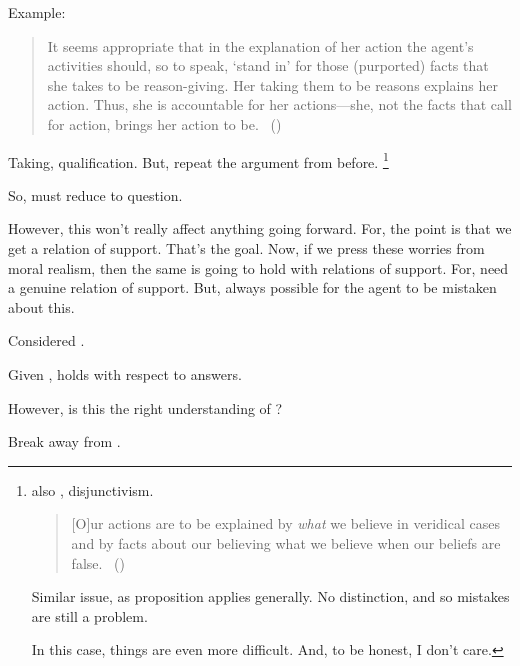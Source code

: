 \begin{note}
  Example:

  \citeauthor{Hieronymi:2011aa}
  \begin{quote}
    It seems appropriate that in the explanation of her action the agent’s activities should, so to speak, ‘stand in’ for those (purported) facts that she takes to be reason-giving.
    Her taking them to be reasons explains her action.
    Thus, she is accountable for her actions---she, not the facts that call for action, brings her action to be.%
    \mbox{ }\hfill\mbox{(\citeyear[425]{Hieronymi:2011aa})}
  \end{quote}

  Taking, qualification.
  But, repeat the argument from before.%
  \footnote{
    \citeauthor{DOro:2013vh} also \citeauthor{Alvarez:2010to}, disjunctivism.
    \begin{quote}
      [O]ur actions are to be explained by \emph{what} we believe in veridical cases and by facts about our believing what we believe when our beliefs are false.%
      \mbox{ }\hfill\mbox{(\citeyear[30]{DOro:2013vh})}
    \end{quote}
    Similar issue, as proposition applies generally.
    No distinction, and so mistakes are still a problem.

    In this case, things are even more difficult.
    And, to be honest, I don't care.
  }

  So, must reduce to question.
\end{note}

\begin{note}
  However, this won't really affect anything going forward.
  For, the point is that we get a relation of support.
  That's the goal.
  Now, if we press these worries from moral realism, then the same is going to hold with relations of support.
  For, need a genuine relation of support.
  But, always possible for the agent to be mistaken about this.
\end{note}

\begin{note}
  Considered \ptivity{}.

  Given \qzS{}, \ptivity{} holds with respect to answers.

  However, is this the right understanding of \qzS{}?
\end{note}

\begin{note}
  Break \qzS{} away from \qWhy{}.
\end{note}

